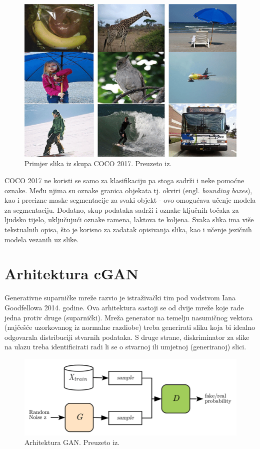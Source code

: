 \documentclass[conference]{IEEEtran}
\begin{document}
\begin{figure}[H]
    \centering
    \includegraphics[width=0.9\linewidth]{imgs/coco_primjeri.png}
    \caption{Primjer slika iz skupa COCO 2017. Preuzeto iz\cite{bourouis2021color}.}
    \label{fig:slike_COCO}
\end{figure}

COCO 2017 ne koristi se samo za klasifikaciju pa stoga sadrži i neke pomoćne oznake.
Među njima su oznake granica objekata tj. okviri (engl. \textit{bounding boxes}), kao i
precizne maske segmentacije za svaki objekt - ovo omogućava učenje modela za segmentaciju.
Dodatno, skup podataka sadrži i oznake ključnih točaka za ljudsko tijelo, uključujući oznake ramena, laktova te koljena.
Svaka slika ima više tekstualnih opisa, što je korisno za zadatak opisivanja slika, kao i učenje jezičnih modela vezanih uz slike.

\section{Arhitektura cGAN}

Generativne suparničke mreže\cite{goodfellow2020generative} razvio je istraživački tim pod vodstvom Iana Goodfellowa 2014. godine. Ova arhitektura sastoji se od dvije mreže koje rade jedna protiv druge (suparnički). Mreža generator na temelju nasumičnog vektora (najčešće uzorkovanog iz normalne razdiobe) treba generirati sliku koja bi idealno odgovarala distribuciji stvarnih podataka. S druge strane, diskriminator za slike na ulazu treba identificirati radi li se o stvarnoj ili umjetnoj (generiranoj) slici. 

\begin{figure}[H]
    \centering
    \includegraphics[width=0.9\linewidth]{imgs/gan.png}
    \caption{Arhitektura GAN. Preuzeto iz\cite{hayes2017logan}.}
    \label{fig:arhitektura_gan}
\end{figure}
\end{document}
